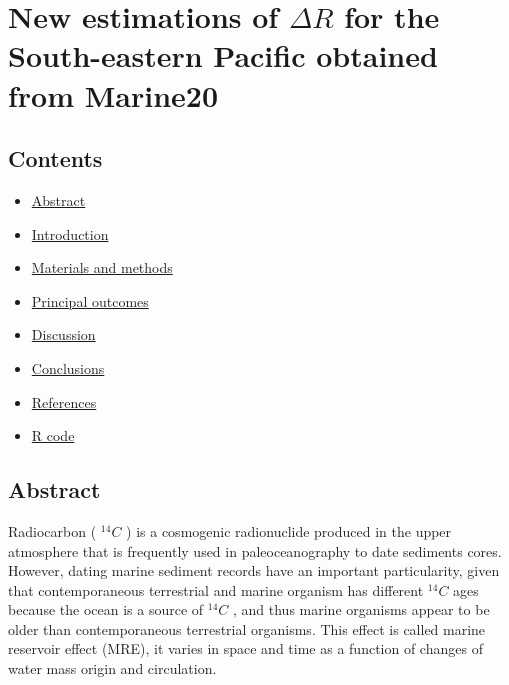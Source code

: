 \documentclass[
]{article}
\author{}
\date{\vspace{-2.5em}}
\providecommand{\tightlist}{%
  \setlength{\itemsep}{0pt}\setlength{\parskip}{0pt}}
\begin{document}
\hypertarget{new-estimations-of-delta-r-for-the-south-eastern-pacific-obtained-from-marine20}{%
\section{\texorpdfstring{New estimations of \(\Delta R\) for the
South-eastern Pacific obtained from
Marine20}{New estimations of \textbackslash Delta R for the South-eastern Pacific obtained from Marine20}}\label{new-estimations-of-delta-r-for-the-south-eastern-pacific-obtained-from-marine20}}

\hypertarget{contents}{%
\subsection{Contents}\label{contents}}

\begin{itemize}
\tightlist
\item
  \protect\hyperlink{abstract}{Abstract}
\item
  \protect\hyperlink{introduction}{Introduction}
\item
  \protect\hyperlink{materials-and-methods}{Materials and methods}
\item
  \protect\hyperlink{principal-outcomes}{Principal outcomes}
\item
  \protect\hyperlink{ux5cux23discussion}{Discussion}
\item
  \protect\hyperlink{conclusions}{Conclusions}
\item
  \protect\hyperlink{references}{References}
\item
  \protect\hyperlink{r-code}{R code}
\end{itemize}

\hypertarget{abstract}{%
\subsection{Abstract}\label{abstract}}

Radiocarbon ( \(^{14}C\) ) is a cosmogenic radionuclide produced in the
upper atmosphere that is frequently used in paleoceanography to date
sediments cores. However, dating marine sediment records have an
important particularity, given that contemporaneous terrestrial and
marine organism has different \(^{14}C\) ages because the ocean is a
source of \(^{14}C\) , and thus marine organisms appear to be older than
contemporaneous terrestrial organisms. This effect is called marine
reservoir effect (MRE), it varies in space and time as a function of
changes of water mass origin and circulation.
\end{document}

